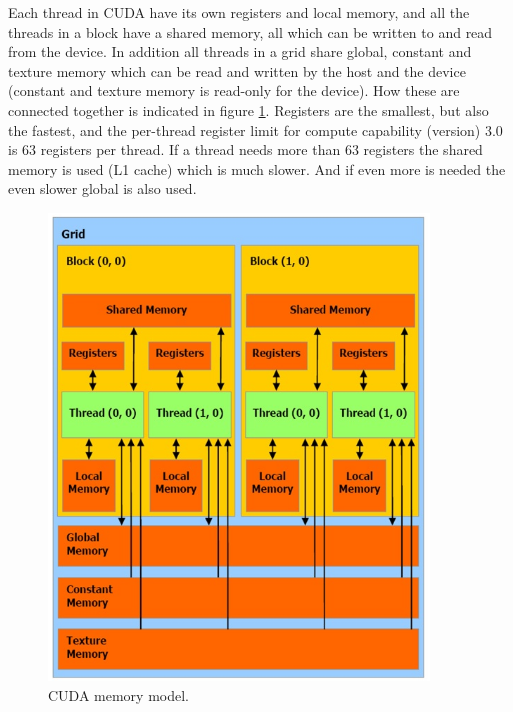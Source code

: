 Each thread in CUDA have its own registers and local memory, and all the threads in a block have a shared memory, all which can be written to and read from the device. In addition all threads in a grid share global, constant and texture memory which can be read and written by the host and the device (constant and texture memory is read-only for the device). How these are connected together is indicated in figure \ref{CUDAMemModel}. Registers are the smallest, but also the fastest, and the per-thread register limit for compute capability (version) 3.0 is 63 registers per thread. If a thread needs more than 63 registers the shared memory is used (L1 cache) which is much slower. And if even more is needed the even slower global is also used.

\begin{figure}[h!]
\centering
\includegraphics[width=0.90\textwidth]{parallel/CUDAMemModel}
\caption{CUDA memory model.}
\label{CUDAMemModel}
\end{figure} 

